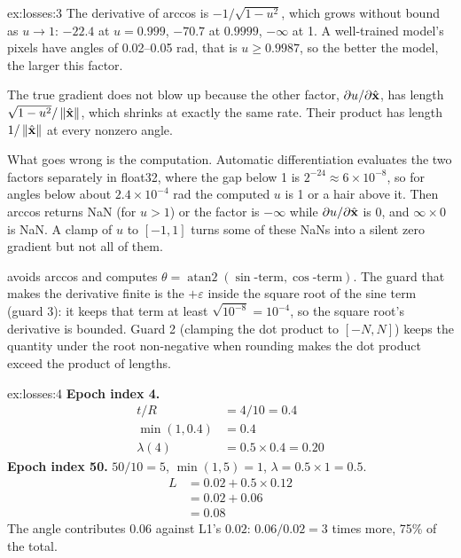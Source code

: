 \begin{solution}{ex:losses:3}
The derivative of arccos is $-1/\sqrt{1 - u^2}$, which grows without bound as $u \to 1$: $-22.4$
at $u = 0.999$, $-70.7$ at $0.9999$, $-\infty$ at 1. A well-trained model's pixels have angles of
0.02--0.05 rad, that is $u \ge 0.9987$, so the better the model, the larger this factor.

The true gradient does not blow up because the other factor, $\partial u/\partial\hat{\mathbf{x}}$, has
length $\sqrt{1 - u^2}/\left\lVert \hat{\mathbf{x}} \right\rVert$, which shrinks at exactly the same rate. Their product has
length $1/\left\lVert \hat{\mathbf{x}} \right\rVert$ at every nonzero angle.

What goes wrong is the computation. Automatic differentiation evaluates the two factors
separately in float32, where the gap below 1 is $2^{-24} \approx 6 \times 10^{-8}$, so for
angles below about $2.4 \times 10^{-4}$ rad the computed $u$ is 1 or a hair above it. Then
arccos returns NaN (for $u > 1$) or the factor is $-\infty$ while $\partial u/\partial\hat{\mathbf{x}}$ is
0, and $\infty \times 0$ is NaN. A clamp of $u$ to $[-1, 1]$ turns some of these NaNs into a
silent zero gradient but not all of them.

 avoids arccos and computes $\theta = \operatorname{atan2}(\sin\text{-term},
\cos\text{-term})$. The guard that makes the derivative finite is the $+\varepsilon$ inside the
square root of the sine term (guard 3): it keeps that term at least $\sqrt{10^{-8}} = 10^{-4}$, so
the square root's derivative is bounded. Guard 2 (clamping the dot product to $[-N, N]$) keeps
the quantity under the root non-negative when rounding makes the dot product exceed the
product of lengths.
\end{solution}

\begin{solution}{ex:losses:4}
\textbf{Epoch index 4.}
\begin{align*}
t/R &= 4/10 = 0.4\\
\min(1, 0.4) &= 0.4\\
\lambda(4) &= 0.5 \times 0.4 = 0.20
\end{align*}
\textbf{Epoch index 50.} $50/10 = 5$, $\min(1, 5) = 1$, $\lambda = 0.5 \times 1 = 0.5$.
\begin{align*}
L &= 0.02 + 0.5 \times 0.12\\
&= 0.02 + 0.06\\
&= 0.08
\end{align*}
The angle contributes $0.06$ against L1's $0.02$: $0.06/0.02 = 3$ times more, 75\% of the
total.
\end{solution}

